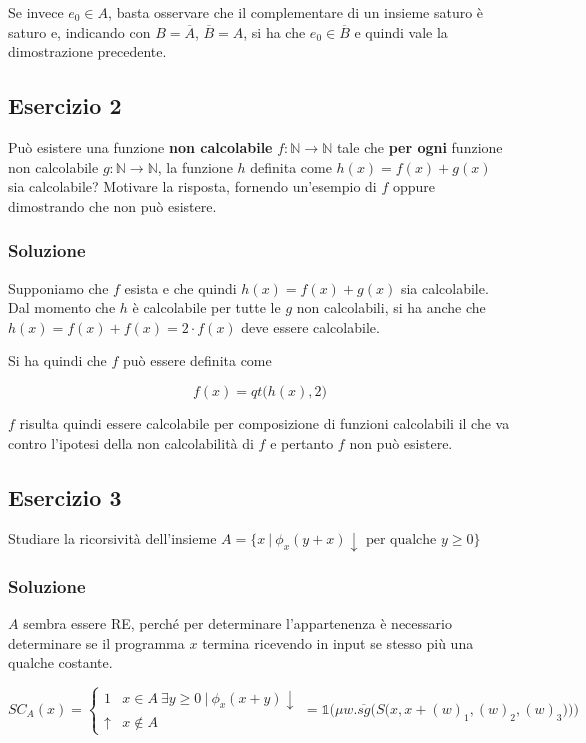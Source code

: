 Se invece $e_0 \in A$, basta osservare che il complementare di un insieme saturo è saturo e, indicando con $B = \overline{A}$, $\overline{B} = A$, si ha che $e_0 \in \overline{B}$ e quindi vale la dimostrazione precedente.

\subsection{Esercizio 2}

Può esistere una funzione \textbf{non calcolabile} $f : \mathbb{N} \rightarrow \mathbb{N}$ tale che \textbf{per ogni} funzione non calcolabile $g : \mathbb{N} \rightarrow \mathbb{N}$, la funzione $h$ definita come $h(x) = f(x) + g(x)$ sia calcolabile? Motivare la risposta, fornendo un'esempio di $f$ oppure dimostrando che non può esistere.

\subsubsection{Soluzione}

Supponiamo che $f$ esista e che quindi $h(x) = f(x) + g(x)$ sia calcolabile. Dal momento che $h$ è calcolabile per tutte le $g$ non calcolabili, si ha anche che $h(x) = f(x) + f(x) = 2\cdot f(x)$ deve essere calcolabile.

Si ha quindi che $f$ può essere definita come

$$
f(x) = qt\big(h(x) , 2\big) 
$$

$f$ risulta quindi essere calcolabile per composizione di funzioni calcolabili il che va contro l'ipotesi della non calcolabilità di $f$ e pertanto $f$ non può esistere.

\subsection{Esercizio 3}

Studiare la ricorsività dell'insieme $A = \{ x \: | \: \phi_x(y+x)\downarrow \text{ per qualche } y \geq 0 \}$

\subsubsection{Soluzione}

$A$ sembra essere RE, perché per determinare l'appartenenza è necessario determinare se il programma $x$ termina ricevendo in input se stesso più una qualche costante.

$$
SC_A(x) = \begin{cases}
1 &x \in A \: \exists y \geq 0 \: | \: \phi_x(x+y)\downarrow\\
\uparrow &x \notin A
\end{cases} =\mathbb{1}\Big( \mu w . \overline{sg}\Big( S\big(x,x+(w)_1,(w)_2, (w)_3 \big) \Big)\Big)
$$

